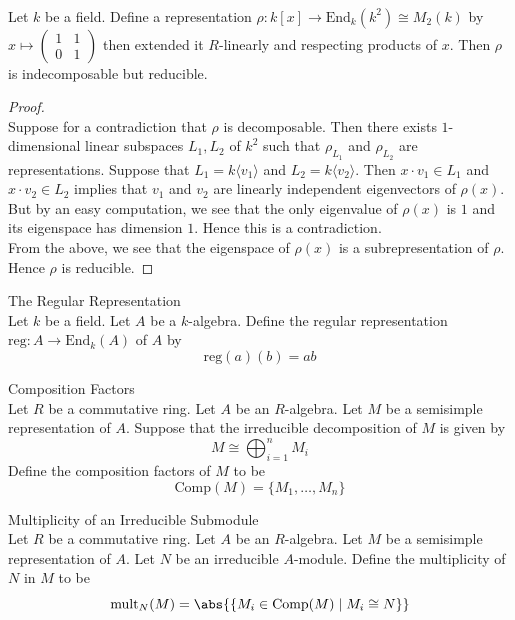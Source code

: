 \documentclass[a4paper]{article}
\begin{document}
\begin{eg}{}{}\\
Let $k$ be a field. Define a representation $\rho:k[x]\to\text{End}_k(k^2)\cong M_2(k)$ by $x\mapsto\begin{pmatrix}
1 & 1\\
0 & 1
\end{pmatrix}$ then extended it $R$-linearly and respecting products of $x$. Then $\rho$ is indecomposable but reducible. 
\begin{proof}\\
Suppose for a contradiction that $\rho$ is decomposable. Then there exists $1$-dimensional linear subspaces $L_1,L_2$ of $k^2$ such that $\rho_{L_1}$ and $\rho_{L_2}$ are representations. Suppose that $L_1=k\langle v_1\rangle$ and $L_2=k\langle v_2\rangle$. Then $x\cdot v_1\in L_1$ and $x\cdot v_2\in L_2$ implies that $v_1$ and $v_2$ are linearly independent eigenvectors of $\rho(x)$. But by an easy computation, we see that the only eigenvalue of $\rho(x)$ is $1$ and its eigenspace has dimension $1$. Hence this is a contradiction. \\

From the above, we see that the eigenspace of $\rho(x)$ is a subrepresentation of $\rho$. Hence $\rho$ is reducible. 
\end{proof}
\end{eg}

\begin{defn}{The Regular Representation}{}\\
Let $k$ be a field. Let $A$ be a $k$-algebra. Define the regular representation $\text{reg}:A\to\text{End}_k(A)$ of $A$ by $$\text{reg}(a)(b)=ab$$
\end{defn}

\begin{defn}{Composition Factors}{}\\
Let $R$ be a commutative ring. Let $A$ be an $R$-algebra. Let $M$ be a semisimple representation of $A$. Suppose that the irreducible decomposition of $M$ is given by $$M\cong\bigoplus_{i=1}^nM_i$$ Define the composition factors of $M$ to be $$\text{Comp}(M)=\{M_1,\dots,M_n\}$$
\end{defn}

\begin{defn}{Multiplicity of an Irreducible Submodule}{}\\
Let $R$ be a commutative ring. Let $A$ be an $R$-algebra. Let $M$ be a semisimple representation of $A$. Let $N$ be an irreducible $A$-module. Define the multiplicity of $N$ in $M$ to be $$\text{mult}_N(M)=\abs{\{M_i\in\text{Comp}(M)\;|\;M_i\cong N\}}$$
\end{defn}
\end{document}
